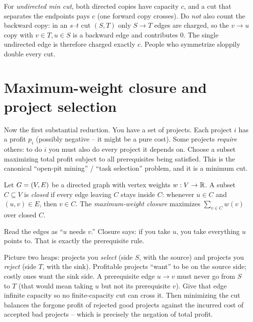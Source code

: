 \begin{trapbox}
For \emph{undirected min cut}, both directed copies have capacity $c$, and a cut that separates the endpoints pays $c$ (one forward copy crosses). Do \emph{not} also count the backward copy: in an $s$--$t$ cut $(S,T)$ only $S\to T$ edges are charged, so the $v\to u$ copy with $v\in T, u\in S$ is a backward edge and contributes $0$. The single undirected edge is therefore charged exactly $c$. People who symmetrize sloppily double every cut.
\end{trapbox}

\section{Maximum-weight closure and project selection}
\label{ch18:closure}

Now the first substantial reduction. You have a set of projects. Each project $i$ has a profit $p_i$ (possibly negative -- it might be a pure cost). Some projects \emph{require} others: to do $i$ you must also do every project it depends on. Choose a subset maximizing total profit subject to all prerequisites being satisfied. This is the canonical ``open-pit mining'' / ``task selection'' problem, and it is a minimum cut.

\begin{definition}[Closure]
\label{ch18:def-closure}
Let $G=(V,E)$ be a directed graph with vertex weights $w:V\to\mathbb{R}$. A subset $C\subseteq V$ is \emph{closed} if every edge leaving $C$ stays inside $C$: whenever $u\in C$ and $(u,v)\in E$, then $v\in C$. The \emph{maximum-weight closure} maximizes $\sum_{v\in C} w(v)$ over closed $C$.
\end{definition}

Read the edges as ``$u$ needs $v$.'' Closure says: if you take $u$, you take everything $u$ points to. That is exactly the prerequisite rule.

\begin{intuitionbox}
Picture two heaps: projects you \emph{select} (side $S$, with the source) and projects you \emph{reject} (side $T$, with the sink). Profitable projects ``want'' to be on the source side; costly ones want the sink side. A prerequisite edge $u\to v$ must never go from $S$ to $T$ (that would mean taking $u$ but not its prerequisite $v$). Give that edge infinite capacity so no finite-capacity cut can cross it. Then minimizing the cut balances the forgone profit of rejected good projects against the incurred cost of accepted bad projects -- which is precisely the negation of total profit.
\end{intuitionbox}

